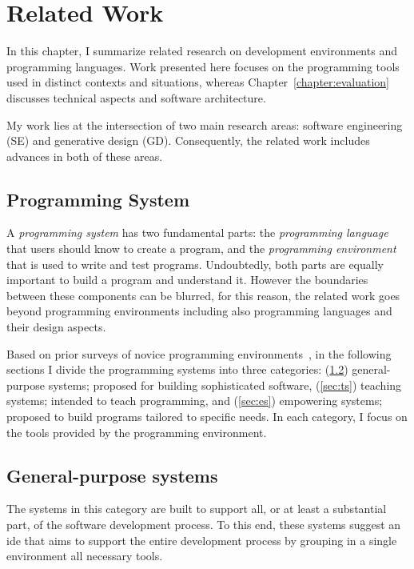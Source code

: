 \chapter{Related Work}
\label{chapter:relatedWork}

In this chapter, I summarize related research on development environments and programming languages. Work presented here focuses on the programming tools used in distinct contexts and situations, whereas Chapter~\ref{chapter:evaluation}  discusses technical aspects and software architecture.

My work lies at the intersection of two main research areas: software engineering (SE) and generative design (GD). Consequently, the related work includes advances in both of these areas.

\section{Programming System}
\label{sec:ps}

A \textit{programming system} has two fundamental parts: the \textit{programming language} that users should know to create a program, and the \textit{programming environment} that is used to write and test programs. Undoubtedly, both parts are equally important to build a program and understand it. However the boundaries between these components can be blurred, for this reason, the related work goes beyond programming environments including also programming languages and their design aspects. 

Based on prior surveys of novice programming environments~\citep{kelleher2005lowering}, in the following sections I divide the programming systems into three categories: (\ref{sec:gs}) general-purpose systems; proposed for building sophisticated software, (\ref{sec:ts}) teaching systems; intended to teach programming, and (\ref{sec:es}) empowering systems; proposed to build programs tailored to specific needs. In each category, I focus on the tools provided by the programming environment.
\section{General-purpose systems}
\label{sec:gs}

The systems in this category are built to support all, or at least a substantial part, of the software development process. To this end, these systems suggest an \gls{ide} that aims to support the entire development process by grouping in a single environment all necessary tools.

